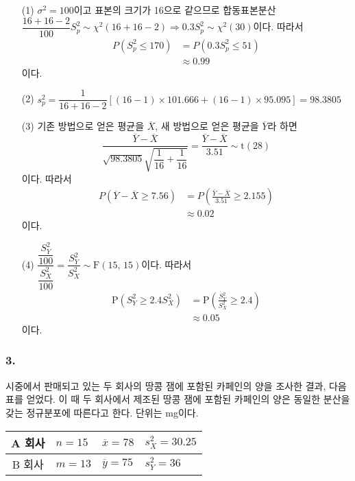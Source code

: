 \begin{itemize}
    \item[(1)] {
        $\sigma^2=100$이고 표본의 크기가 16으로 같으므로 합동표본분산 $\dfrac{16+16-2}{100}S_p^2\sim \chi^2\left(16+16-2\right)\Rightarrow 0.3 S_p^2\sim \chi^2\left(30\right)$이다.
        따라서
        \begin{align*}
            P\left(S_p^2 \leq 170\right) &= P\left(0.3S_p^2 \leq 51\right) \\
            &\approx 0.99
        \end{align*}
        이다.
    }
    \item[(2)] {
        $s_p^2=\dfrac{1}{16+16-2}\left[\left(16-1\right)\times101.666 + \left(16-1\right)\times95.095\right]=98.3805$
    }
    \item[(3)] {
        기존 방법으로 얻은 평균을 $\overline{X}$, 새 방법으로 얻은 평균을 $\overline{Y}$라 하면
        \[\frac{\overline{Y}-\overline{X}}{\sqrt{98.3805}\sqrt{\dfrac{1}{16}+\dfrac{1}{16}}}=\frac{\overline{Y}-\overline{X}}{3.51}\sim\mathrm{t}\left(28\right)\]
        이다. 따라서
        \begin{align*}
            P\left(\overline{Y}-\overline{X}\geq 7.56\right) &= P\left(\frac{\overline{Y}-\overline{X}}{3.51}\geq 2.155\right) \\
            &\approx 0.02
        \end{align*}
        이다.
    }
    \item[(4)] {
        $\dfrac{\dfrac{S_Y^2}{100}}{\dfrac{S_X^2}{100}}=\dfrac{S_Y^2}{S_X^2}\sim \mathrm{F}\left(15,\,15\right)$이다. 따라서
        \begin{align*}
            \mathrm{P}\left(S_Y^2 \geq 2.4S_X^2\right) &= \mathrm{P}\left(\frac{S_Y^2}{S_X^2} \geq 2.4\right) \\
            &\approx 0.05
        \end{align*}
        이다.
    }
\end{itemize}

\subsubsection{3.} 시중에서 판매되고 있는 두 회사의 땅콩 잼에 포함된 카페인의 양을 조사한 결과, 다음 표를 얻었다.
이 때 두 회사에서 제조된 땅콩 잼에 포함된 카페인의 양은 동일한 분산을 갖는 정규분포에 따른다고 한다. 단위는 mg이다.

\begin{center}
    \begin{tabular}{c|lll}
        \hline
        A 회사 & $n=15$ & $\overline{x} = 78$ & $s_X^2 = 30.25$ \\
        \hline
        B 회사 & $m=13$ & $\overline{y} = 75$ & $s_Y^2 = 36$ \\
        \hline
    \end{tabular}
\end{center}

